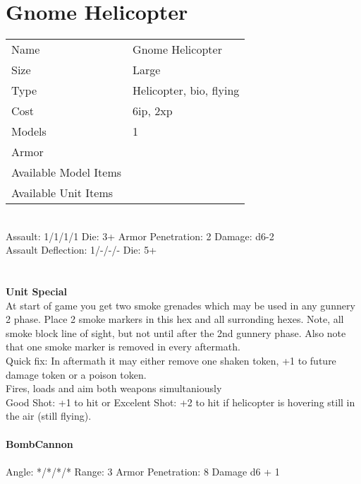 






\pagebreak

\section{ Gnome Helicopter }

\begin{tabular}{ll}
  Name & Gnome Helicopter \\
  Size & Large\\
  Type & Helicopter, bio, flying\\
  Cost & 6ip, 2xp\\
  Models & 1\\
  Armor & \\
  Available Model Items &  \\
  Available Unit Items &  \\
\end{tabular}

\ \\
Assault: 1/1/1/1 Die: 3+ Armor Penetration: 2 Damage: d6-2 \\
Assault Deflection: 1/-/-/- Die: 5+\\
\indent  \\
\ \\

{\bf Unit Special} \\
At start of game you get two smoke grenades which may be used in any gunnery 2 phase. Place 2 smoke markers in this hex and all surronding hexes. Note, all smoke block line of sight, but not until after the 2nd gunnery phase. Also note that one smoke marker is removed in every aftermath. \\ Quick fix: In aftermath it may either remove one shaken token, +1 to future damage token or a poison token.\\ Fires, loads and aim both weapons simultaniously \\ Good Shot: +1 to hit or Excelent Shot: +2 to hit if helicopter is hovering still in the air (still flying).
\ \\
\ \\
{\bf BombCannon } \\
\ \\
Angle: */*/*/* Range: 3 Armor Penetration: 8 Damage d6 + 1 \\
\indent  \\



